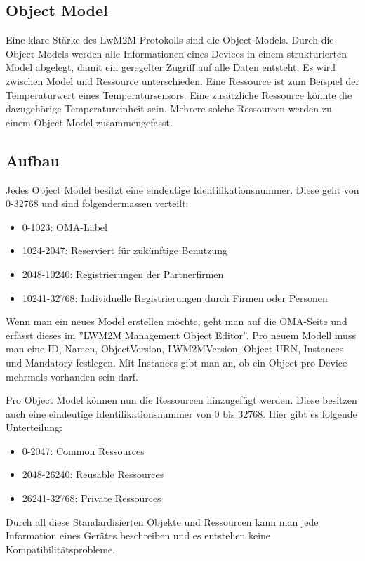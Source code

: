 \subsection{Object Model}
Eine klare Stärke des LwM2M-Protokolls sind die Object Models. Durch die Object Models werden alle Informationen eines Devices in einem strukturierten Model abgelegt, damit ein geregelter Zugriff auf alle Daten entsteht. Es wird zwischen Model und Ressource unterschieden. Eine Ressource ist zum Beispiel der Temperaturwert eines Temperatursensors. Eine zusätzliche Ressource könnte die dazugehörige Temperatureinheit sein. Mehrere solche Ressourcen werden zu einem Object Model zusammengefasst.

\subsection{Aufbau}
Jedes Object Model besitzt eine eindeutige Identifikationsnummer. Diese geht von 0-32768 und sind folgendermassen verteilt:
\begin{itemize}
\item 0-1023: OMA-Label
\item 1024-2047: Reserviert für zukünftige Benutzung
\item 2048-10240: Registrierungen der Partnerfirmen
\item 10241-32768: Individuelle Registrierungen durch Firmen oder Personen
\end{itemize}
Wenn man ein neues Model erstellen möchte, geht man auf die OMA-Seite und erfasst dieses im ''LWM2M Management Object Editor''. Pro neuem Modell muss man eine ID, Namen, ObjectVersion, LWM2MVersion, Object URN, Instances und Mandatory festlegen. Mit Instances gibt man an, ob ein Object pro Device mehrmals vorhanden sein darf.

Pro Object Model können nun die Ressourcen hinzugefügt werden. Diese besitzen auch eine eindeutige Identifikationsnummer von 0 bis 32768. Hier gibt es folgende Unterteilung:
\begin{itemize}
\item 0-2047: Common Ressources
\item 2048-26240: Reusable Ressources
\item 26241-32768: Private Ressources
\end{itemize}

Durch all diese Standardisierten Objekte und Ressourcen kann man jede Information eines Gerätes beschreiben und es entstehen keine Kompatibilitätsprobleme.

